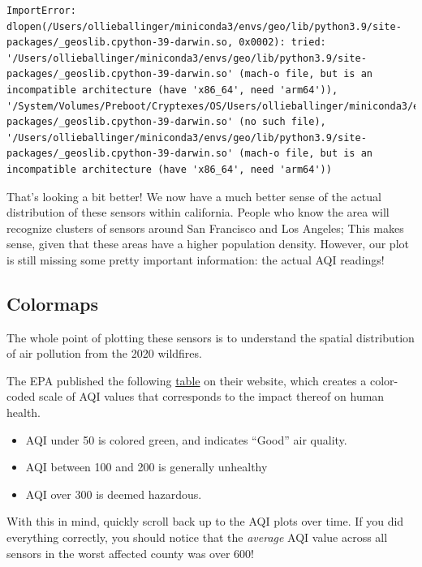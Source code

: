 \documentclass[
  letterpaper,
  DIV=11,
  numbers=noendperiod]{scrreprt}
\providecommand{\tightlist}{%
  \setlength{\itemsep}{0pt}\setlength{\parskip}{0pt}}\usepackage{longtable,booktabs,array}
\begin{document}
\begin{verbatim}
ImportError: dlopen(/Users/ollieballinger/miniconda3/envs/geo/lib/python3.9/site-packages/_geoslib.cpython-39-darwin.so, 0x0002): tried: '/Users/ollieballinger/miniconda3/envs/geo/lib/python3.9/site-packages/_geoslib.cpython-39-darwin.so' (mach-o file, but is an incompatible architecture (have 'x86_64', need 'arm64')), '/System/Volumes/Preboot/Cryptexes/OS/Users/ollieballinger/miniconda3/envs/geo/lib/python3.9/site-packages/_geoslib.cpython-39-darwin.so' (no such file), '/Users/ollieballinger/miniconda3/envs/geo/lib/python3.9/site-packages/_geoslib.cpython-39-darwin.so' (mach-o file, but is an incompatible architecture (have 'x86_64', need 'arm64'))
\end{verbatim}

That's looking a bit better! We now have a much better sense of the
actual distribution of these sensors within california. People who know
the area will recognize clusters of sensors around San Francisco and Los
Angeles; This makes sense, given that these areas have a higher
population density. However, our plot is still missing some pretty
important information: the actual AQI readings!

\hypertarget{colormaps}{%
\subsection{Colormaps}\label{colormaps}}

The whole point of plotting these sensors is to understand the spatial
distribution of air pollution from the 2020 wildfires.

The EPA published the following
\href{https://www.airnow.gov/aqi/aqi-basics/}{table} on their website,
which creates a color-coded scale of AQI values that corresponds to the
impact thereof on human health.

\begin{itemize}
\tightlist
\item
  AQI under 50 is colored green, and indicates ``Good'' air quality.
\item
  AQI between 100 and 200 is generally unhealthy
\item
  AQI over 300 is deemed hazardous.
\end{itemize}

With this in mind, quickly scroll back up to the AQI plots over time. If
you did everything correctly, you should notice that the \emph{average}
AQI value across all sensors in the worst affected county was over 600!
\end{document}
